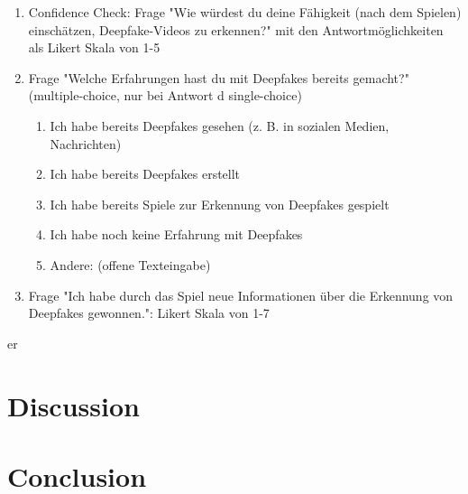 \begin{enumerate}
    \item Confidence Check: Frage "Wie würdest du deine Fähigkeit (nach dem Spielen) einschätzen, Deepfake-Videos zu erkennen?" mit den Antwortmöglichkeiten als Likert Skala von 1-5
    \item Frage "Welche Erfahrungen hast du mit Deepfakes bereits gemacht?" (multiple-choice, nur bei Antwort d single-choice)
    \begin{enumerate} [label=\alph*)]
        \item Ich habe bereits Deepfakes gesehen (z. B. in sozialen Medien, Nachrichten)
        \item Ich habe bereits Deepfakes erstellt
        \item Ich habe bereits Spiele zur Erkennung von Deepfakes gespielt
        \item Ich habe noch keine Erfahrung mit Deepfakes
        \item Andere: (offene Texteingabe)
    \end{enumerate}
    \item Frage "Ich habe durch das Spiel neue Informationen über die Erkennung von Deepfakes gewonnen.": Likert Skala von 1-7
\end{enumerate}


\gls{er}

\chapter{Discussion}

\chapter{Conclusion}
\label{sec:conclusion}

